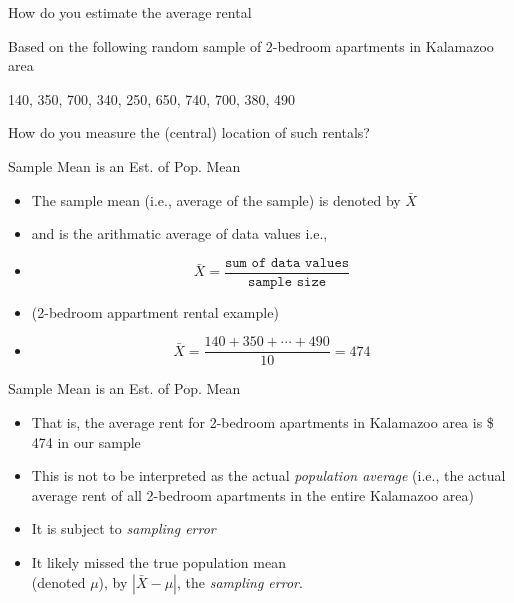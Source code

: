 \documentclass[14pt]{beamer}\usepackage[]{graphicx}\usepackage[]{color}
\begin{document}
\begin{frame}[fragile]{How do you estimate the average rental}

Based on the following random sample of 2-bedroom apartments in Kalamazoo area

\vspace{3mm}



  140, 350, 700, 340, 250, 650, 740, 700, 380, 490
  
\vspace{3mm}

  How do you measure the (central) location of such rentals?

\end{frame}

\begin{frame}[fragile]{Sample Mean is an Est. of Pop. Mean}

\begin{itemize}
\item<1-> The sample mean (i.e., average of the sample) is denoted by $\bar{X}$
\item<2-> and is the arithmatic average of data values  i.e.,
\item<3->
\begin{equation*}
\bar{X} = \frac{\texttt{sum of data values}}{\texttt{sample size}}
\end{equation*}
\item<4-> (2-bedroom appartment rental example)
\item<5->
\begin{equation*}
\bar{X} = \frac{140 + 350 + \cdots + 490}{10} = 474
\end{equation*}
\end{itemize}

\end{frame}
 
\begin{frame}[fragile]{Sample Mean is an Est. of Pop. Mean}

\begin{itemize}
\item<1-> That is, the average rent for 2-bedroom apartments in  Kalamazoo area is \$ 474 in our sample
\item<2-> This is not to be interpreted as the actual \textit{population average}  (i.e., the actual average rent of all 2-bedroom apartments in  the entire Kalamazoo area)
\item<3-> It is subject to \textit{sampling error}
\item<4-> It likely missed the true population mean \\ (denoted $\mu$), by $| \bar{X} - \mu |$,  the \textit{sampling error}.
\end{itemize}

\end{frame}
\end{document}
